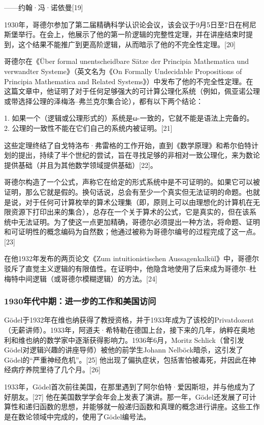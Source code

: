 ——约翰·冯·诺依曼[19]

1930年，哥德尔参加了第二届精确科学认识论会议，该会议于9月5日至7日在柯尼斯堡举行。在会上，他展示了他的第一阶逻辑的完整性定理，并在讲座结束时提到，这个结果不能推广到更高阶逻辑，从而暗示了他的不完全性定理。[20]

哥德尔在《Über formal unentscheidbare Sätze der Principia Mathematica und verwandter Systeme》（英文名为《On Formally Undecidable Propositions of Principia Mathematica and Related Systems》）中发布了他的不完全性定理。在这篇文章中，他证明了对于任何足够强大的可计算公理化系统（例如，佩亚诺公理或带选择公理的泽梅洛–弗兰克尔集合论），都有以下两个结论：

1. 如果一个（逻辑或公理形式的）系统是ω-一致的，它就不能是语法上完备的。
2. 公理的一致性不能在它们自己的系统内被证明。[21]

这些定理终结了自戈特洛布·弗雷格的工作开始，直到《数学原理》和希尔伯特计划的提出，持续了半个世纪的尝试，旨在寻找足够的非相对一致公理化，来为数论提供基础（并且为其他数学领域提供基础）[22]。

哥德尔构造了一个公式，声称它在给定的形式系统中是不可证明的。如果它可以被证明，那么它就是假的。换句话说，总会有至少一个真实但无法证明的命题。也就是说，对于任何可计算枚举的算术公理集（即，原则上可以由理想化的计算机在无限资源下打印出来的集合），总存在一个关于算术的公式，它是真实的，但在该系统中无法证明。为了使这一点更加精确，哥德尔必须提出一种方法，将命题、证明和可证明性的概念编码为自然数；他通过被称为哥德尔编号的过程完成了这一点。[23]

在他1932年发布的两页论文《Zum intuitionistischen Aussagenkalkül》中，哥德尔驳斥了直觉主义逻辑的有限值性。在证明中，他隐含地使用了后来成为哥德尔–杜梅特中间逻辑（或哥德尔模糊逻辑）的方法。[24]
\subsubsection{1930年代中期：进一步的工作和美国访问}
Gödel于1932年在维也纳获得了教授资格，并于1933年成为了该校的Privatdozent（无薪讲师）。1933年，阿道夫·希特勒在德国上台，接下来的几年，纳粹在奥地利和维也纳的数学家中逐渐获得影响力。1936年6月，Moritz Schlick（曾引发Gödel对逻辑兴趣的讲座导师）被他的前学生Johann Nelböck暗杀，这引发了Gödel的“严重神经危机”。[25] 他出现了偏执症状，包括害怕被毒死，并因此在神经病疗养院里待了几个月。[26]

1933年，Gödel首次前往美国，在那里遇到了阿尔伯特·爱因斯坦，并与他成为了好朋友。[27] 他在美国数学学会年会上发表了演讲。那一年，Gödel还发展了可计算性和递归函数的思想，并能够就一般递归函数和真理的概念进行讲座。这些工作是在数论领域中完成的，使用了Gödel编号法。

